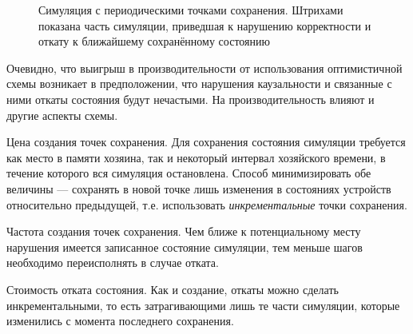 \begin{figure}[htbp]
    \caption[Симуляция с периодическими точками сохранения]{Симуляция с периодическими точками сохранения. Штрихами показана часть симуляции, приведшая к нарушению корректности и откату к ближайшему сохранённому состоянию}
    \label{fig:checkpoints}
    
\end{figure}

Очевидно, что выигрыш в производительности от использования оптимистичной схемы возникает в предположении, что нарушения каузальности и связанные с ними откаты состояния будут нечастыми. На производительность влияют и другие аспекты схемы.

\begin{description*}
    \item[Цена создания точек сохранения.] Для сохранения состояния симуляции требуется как место в памяти хозяина, так и некоторый интервал хозяйского времени, в течение которого вся симуляция остановлена. Способ минимизировать обе величины --- сохранять в новой точке лишь изменения в состояниях устройств относительно предыдущей, т.е. использовать \textit{инкрементальные} точки сохранения.
    \item[Частота создания точек сохранения.] Чем ближе к потенциальному месту нарушения имеется записанное состояние симуляции, тем меньше шагов необходимо переисполнять в случае отката.
    \item[Стоимость отката состояния.] Как и создание, откаты можно сделать инкрементальными, то есть затрагивающими лишь те части симуляции, которые изменились с момента последнего сохранения.
\end{description*}

